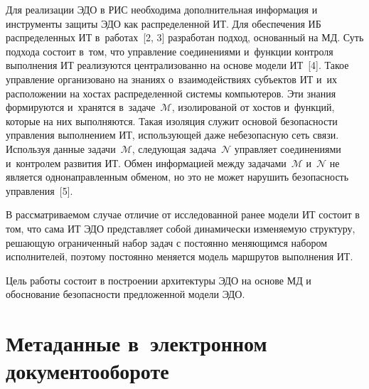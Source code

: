 \begin{multicols}{2}
  Для реализации ЭДО в РИС необходима дополнительная информация и 
инструменты защиты ЭДО как распределенной ИТ. Для 
обеспечения ИБ распределенных ИТ в~работах~[2, 3] разработан подход, 
основанный на МД. Суть подхода состоит в~том, что управление 
соединениями и~функции контроля выполнения ИТ реализуются централизованно 
на основе модели ИТ~[4]. Такое управление организовано на знаниях 
о~взаимодействиях субъектов ИТ и~их расположении на хостах распределенной 
системы компьютеров. Эти знания формируются и~хранятся 
в~задаче~$\mathcal{M}$, изолированой от хостов и~функций, которые на них 
выполняются. Такая изоляция служит основой безопас\-ности управ\-ле\-ния 
выполнением ИТ, использующей даже небезопасную сеть связи. Используя 
данные задачи~$\mathcal{M}$, следующая задача~$\mathcal{N}$ управляет 
соединениями и~контролем развития ИТ. Обмен информацией между 
задачами~$\mathcal{M}$ и~$\mathcal{N}$ не является однонаправленным 
обменом, но это не может нарушить безопасность управления~[5].
  
  В рассматриваемом случае отличие от исследованной ранее модели ИТ состоит 
в том, что сама ИТ ЭДО представляет собой динамически изменяемую структуру, 
решающую ограниченный набор задач с постоянно меняющимся набором 
исполнителей, поэтому постоянно меняется модель маршрутов выполнения ИТ.
  
  Цель работы состоит в построении архитектуры ЭДО на основе МД и 
обоснование безопасности предложенной модели ЭДО.
  
  \section{Метаданные в~электронном документообороте}
  

\end{multicols}
